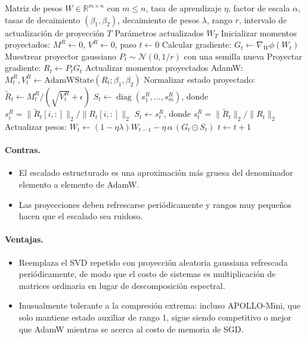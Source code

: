 \begin{algorithm}[H]
\caption{APOLLO / APOLLO-Mini Escalado de Gradiente Estructurado}
\label{alg:apollo-family}
\begin{algorithmic}[1]
\Require Matriz de pesos $W \in \mathbb{R}^{m \times n}$ con $m \le n$, tasa de aprendizaje $\eta$, factor de escala $\alpha$, tasas de decaimiento $(\beta_1, \beta_2)$, decaimiento de pesos $\lambda$, rango $r$, intervalo de actualización de proyección $T$
\Ensure Parámetros actualizados $W_T$
\State Inicializar momentos proyectados: $M^R \gets 0$, $V^R \gets 0$, paso $t \gets 0$
\Repeat
    \State Calcular gradiente: $G_t \gets \nabla_W \phi(W_t)$
        \State Muestrear proyector gaussiano $P_t \sim \mathcal{N}(0, 1/r)$ con una semilla nueva
    \EndIf
    \State Proyectar gradiente: $R_t \gets P_t G_t$ 
    \State Actualizar momentos proyectados AdamW: $M_t^R, V_t^R \gets \text{AdamWState}(R_t; \beta_1, \beta_2)$
    \State Normalizar estado proyectado: $\widetilde{R}_t \gets M_t^R / (\sqrt{V_t^R}+\epsilon)$
        \State $S_t \gets \operatorname{diag}(s_1^R, \ldots, s_m^R)$, donde $s_i^R = \|\widetilde{R}_t[i,:]\|_2 / \|R_t[i,:]\|_2$
    \Else
        \State $S_t \gets s_t^R$, donde $s_t^R = \|\widetilde{R}_t\|_2 / \|R_t\|_2$
    \EndIf
    \State Actualizar pesos: $W_t \gets (1-\eta\lambda)W_{t-1} - \eta\,\alpha\,(G_t \odot S_t)$
    \State $t \gets t+1$
\end{algorithmic}
\end{algorithm}

\paragraph{Contras.}
\begin{itemize}[leftmargin=*]
\item El escalado estructurado es una aproximación más gruesa del denominador elemento a elemento de AdamW.
\item Las proyecciones deben refrescarse periódicamente y rangos muy pequeños hacen que el escalado sea ruidoso.
\end{itemize}

\paragraph{Ventajas.}
\begin{itemize}[leftmargin=*]
\item Reemplaza el SVD repetido con proyección aleatoria gaussiana refrescada periódicamente, de modo que el costo de sistemas es multiplicación de matrices ordinaria en lugar de descomposición espectral.
\item Inusualmente tolerante a la compresión extrema: incluso APOLLO-Mini, que solo mantiene estado auxiliar de rango 1, sigue siendo competitivo o mejor que AdamW mientras se acerca al costo de memoria de SGD.
\end{itemize}

